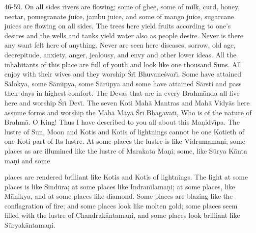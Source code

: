 46-59. On all sides rivers are flowing; some of ghee, some of milk, curd, honey, nectar, pomegranate juice, jambu juice, and some of mango juice, sugarcane juices are flowing on all sides. The trees here yield fruits according to one's desires and the wells and tanks yield water also as people desire. Never is there any want felt here of anything. Never are seen here diseases, sorrow, old age, decrepitude, anxiety, anger, jealousy, and envy and other lower ideas. All the inhabitants of this place are full of youth and look like one thousand Suns. All enjoy with their wives and they worship \'Sr\={\i} Bhuvane\'svar\={\i}. Some have attained S\=alokya, some S\=am\={\i}pya, some S\=ar\=upya and some have attained S\=arsti and pass their days in highest comfort. The Devas that are in every Brahm\=anda all live here and worship \'Sr\={\i} Dev\={\i}. The seven Koti Mah\=a Mantras and Mah\=a Vidy\=as here assume forms and worship the Mah\=a M\=ay\=a \'Sr\={\i} Bhagavat\={\i}, Who is of the nature of Brahm\=a. O King! Thus I have described to you all about this Ma\d{n}idv\={\i}pa. The lustre of Sun, Moon and Kotis and Kotis of lightnings cannot be one Kotieth of one Koti part of Its lustre. At some places the lustre is like Vidrumama\d{n}i; some places as are illumined like the lustre of Marakata Ma\d{n}i; some, like S\=urya K\=anta ma\d{n}i and some

places are rendered brilliant like Kotis and Kotis of lightnings. The light at some places is like Sind\=ura; at some places like Indran\={\i}lama\d{n}i; at some places, like M\=a\d{n}ikya, and at some places like diamond. Some places are blazing like the conflagration of fire; and some places look like molten gold; some places seem filled with the lustre of Chandrak\=antama\d{n}i, and some places look brilliant like S\=uryak\=antama\d{n}i.

